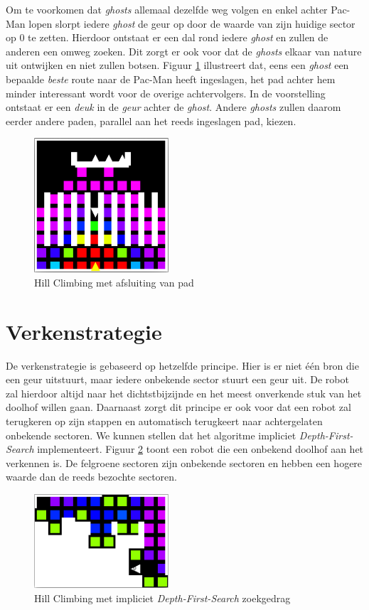 \documentclass[12pt,a4paper]{report}
\begin{document}
Om te voorkomen dat \emph{ghosts} allemaal dezelfde weg volgen en enkel achter Pac-Man lopen slorpt iedere \emph{ghost} de geur op door de waarde van zijn huidige sector op 0 te zetten. Hierdoor ontstaat er een dal rond iedere \emph{ghost} en zullen de anderen een omweg zoeken. Dit zorgt er ook voor dat de \emph{ghosts} elkaar van nature uit ontwijken en niet zullen botsen. Figuur \ref{fig:hillclimbing2} illustreert dat, eens een \emph{ghost} een bepaalde \emph{beste} route naar de Pac-Man heeft ingeslagen, het pad achter hem minder interessant wordt voor de overige achtervolgers. In de voorstelling ontstaat er een \emph{deuk} in de \emph{geur} achter de \emph{ghost}. Andere \emph{ghosts} zullen daarom eerder andere paden, parallel aan het reeds ingeslagen pad, kiezen.

\begin{figure}[htbp]
  \centering
  \includegraphics[width=50mm]{resources/hillclimbing2.png}
  \caption{Hill Climbing met afsluiting van pad}
  \label{fig:hillclimbing2}
\end{figure}

\section{Verkenstrategie}

De verkenstrategie is gebaseerd op hetzelfde principe. Hier is er niet \'e\'en bron die een geur uitstuurt, maar iedere onbekende sector stuurt een geur uit. De robot zal hierdoor altijd naar het dichtstbijzijnde en het meest onverkende stuk van het doolhof willen gaan. Daarnaast zorgt dit principe er ook voor dat een robot zal terugkeren op zijn stappen en automatisch terugkeert naar achtergelaten onbekende sectoren. We kunnen stellen dat het algoritme impliciet \emph{Depth-First-Search} implementeert. Figuur \ref{fig:dfs} toont een robot die een onbekend doolhof aan het verkennen is. De felgroene sectoren zijn onbekende sectoren en hebben een hogere waarde dan de reeds bezochte sectoren.

\begin{figure}[htbp]
  \centering
  \includegraphics[width=50mm]{resources/dfs.png}
  \caption{Hill Climbing met impliciet \emph{Depth-First-Search} zoekgedrag}
  \label{fig:dfs}
\end{figure}
\end{document}
